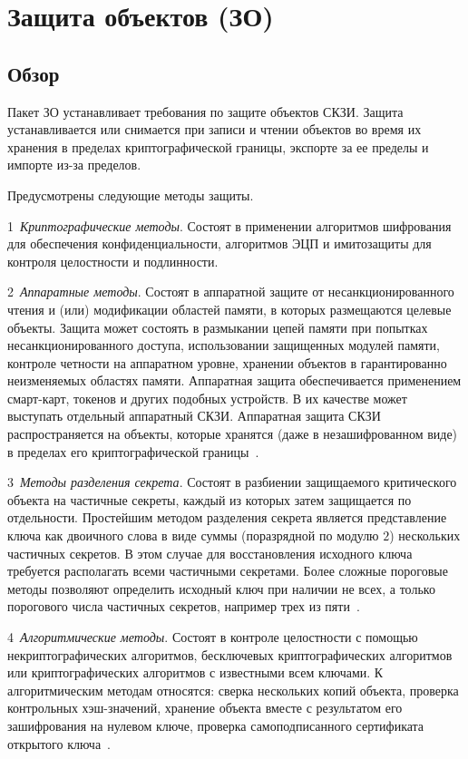 \section{Защита объектов (ЗО)}\label{DP}

\subsection{Обзор}\label{DP.Defs}

Пакет ЗО устанавливает требования по защите объектов СКЗИ. 
Защита устанавливается или снимается при записи и чтении объектов 
во время их хранения в пределах криптографической границы, экспорте за ее 
пределы и импорте из-за пределов. 

Предусмотрены следующие методы защиты.

1~{\it Криптографические методы}. 
Состоят в применении алгоритмов шифрования для обеспечения конфиденциальности, 
алгоритмов ЭЦП и имитозащиты для контроля целостности и подлинности.

2~{\it Аппаратные методы}. 
Состоят в аппаратной защите от несанкционированного чтения и (или) модификации
областей памяти, в которых размещаются целевые объекты. 
%
Защита может состоять в размыкании цепей памяти при попытках 
несанкционированного доступа, использовании защищенных модулей памяти, 
контроле четности на аппаратном уровне, хранении объектов в гарантированно 
неизменяемых областях памяти.
%
Аппаратная защита обеспечивается применением смарт-карт, токенов и других
подобных устройств. В их качестве может выступать отдельный аппаратный СКЗИ.
%
Аппаратная защита СКЗИ распространяется на объекты, которые хранятся 
(даже в незашифрованном виде) в пределах его криптографической 
границы~.

3~{\it Методы разделения секрета}. 
Состоят в разбиении защищаемого критического объекта на частичные секреты, 
каждый из которых затем защищается по отдельности.
%
Простейшим методом разделения секрета является представление
ключа как двоичного слова в виде суммы (поразрядной по модулю $2$)
нескольких частичных секретов. 
В этом случае для восстановления исходного 
ключа требуется располагать всеми частичными секретами.
%
Более сложные пороговые методы позволяют 
определить исходный ключ при наличии не всех, 
а только порогового числа частичных секретов, 
например трех из пяти~.

4~{\it Алгоритмические методы}. 
Состоят в контроле целостности с помощью некриптографических
алгоритмов, бесключевых криптографических алгоритмов
или криптографических алгоритмов с известными всем ключами.
%
К алгоритмическим методам относятся: 
сверка нескольких копий объекта, 
проверка контрольных хэш-значений,
хранение объекта вместе с результатом его зашифрования на нулевом ключе,
проверка самоподписанного сертификата открытого ключа~.

